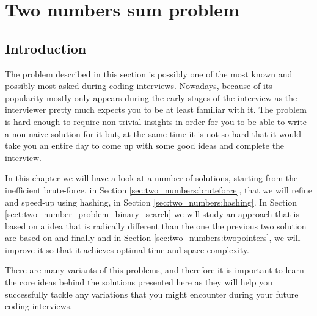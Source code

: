 %


\chapter{Two numbers sum problem}
\label{ch:two_numbers_sum}
\section*{Introduction}
The problem described in this section is possibly one of the most known and possibly most asked
during coding interviews. Nowadays, because of its popularity mostly only appears during the early
stages of the interview as the interviewer pretty much expects you to be at least familiar
with it. The problem is hard enough to require non-trivial insights in order for you to be able to
write a non-naive solution for it but, at the same time it is not so hard that it would take you an
entire day to come up with some good ideas and complete the interview. 

In this chapter we will have a look at a number of solutions, starting from the inefficient brute-force, in Section
\ref{sec:two_numbers:bruteforce}, that we will refine and speed-up using hashing, in Section
\ref{sec:two_numbers:hashing}. In Section \ref{sect:two_number_problem_binary_search} we will study
an approach that is based on a idea that is radically different than the one the previous
two solution are based on and finally and in Section \ref{sec:two_numbers:twopointers}, we will improve it so
that it achieves optimal time and space complexity.

There are many variants of this problems, and therefore it is important to learn the core ideas
behind the solutions presented here as they will help you successfully tackle any variations that
you might encounter during your future coding-interviews.

